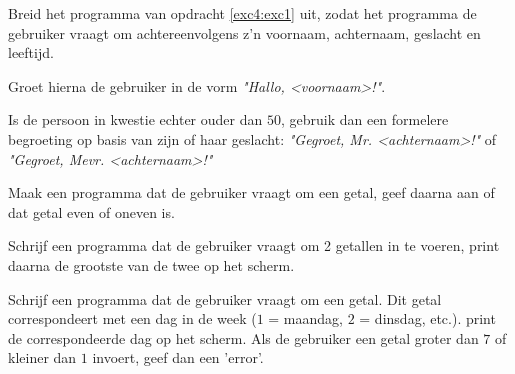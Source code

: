 \begin{exercise}
Breid het programma van opdracht \ref{exc4:exc1} uit, zodat het programma de gebruiker vraagt om achtereenvolgens z'n voornaam, achternaam, geslacht en leeftijd. 

Groet hierna de gebruiker in de vorm \textit{"Hallo, <voornaam>!"}. 

Is de persoon in kwestie echter ouder dan $50$, gebruik dan een formelere begroeting op basis van zijn of haar geslacht: \textit{"Gegroet, Mr. <achternaam>!"} of \textit{"Gegroet, Mevr. <achternaam>!"}
\end{exercise}

\begin{exercise}
Maak een programma dat de gebruiker vraagt om een getal, geef daarna aan of dat getal even of oneven is.
\end{exercise}

\begin{exercise}
Schrijf een programma dat de gebruiker vraagt om 2 getallen in te voeren, print daarna de grootste van de twee op het scherm. 
\end{exercise}

\begin{exercise}
Schrijf een programma dat de gebruiker vraagt om een getal. Dit getal correspondeert met een dag in de week ($1$ = maandag, $2$ = dinsdag, etc.). print de correspondeerde dag op het scherm. Als de gebruiker een getal groter dan $7$ of kleiner dan $1$ invoert, geef dan een 'error'.
\end{exercise}

